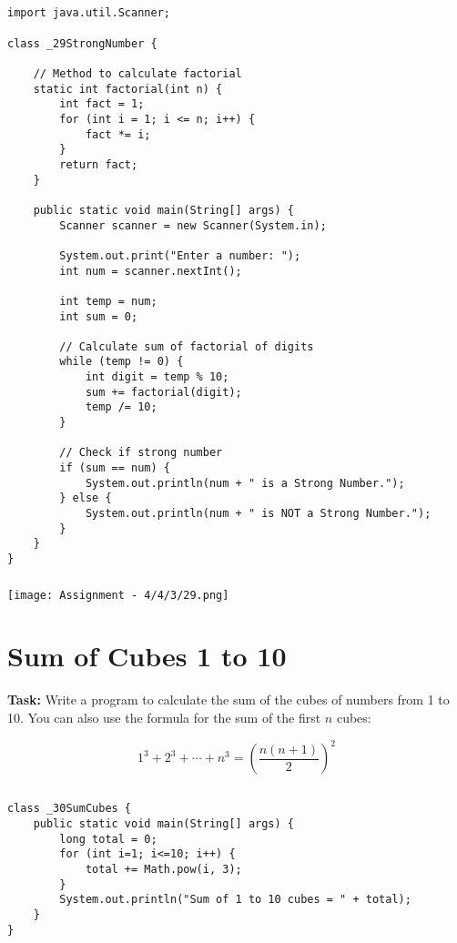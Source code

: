 \documentclass[12pt,a4paper]{article}
\begin{document}
\subsection{}
\begin{lstlisting}
import java.util.Scanner;

class _29StrongNumber {
    
    // Method to calculate factorial
    static int factorial(int n) {
        int fact = 1;
        for (int i = 1; i <= n; i++) {
            fact *= i;
        }
        return fact;
    }
    
    public static void main(String[] args) {
        Scanner scanner = new Scanner(System.in);
    
        System.out.print("Enter a number: ");
        int num = scanner.nextInt();
    
        int temp = num;
        int sum = 0;
    
        // Calculate sum of factorial of digits
        while (temp != 0) {
            int digit = temp % 10;
            sum += factorial(digit);
            temp /= 10;
        }
    
        // Check if strong number
        if (sum == num) {
            System.out.println(num + " is a Strong Number.");
        } else {
            System.out.println(num + " is NOT a Strong Number.");
        }
    }
}
\end{lstlisting}

\subsubsection{}
\begin{center}
    \texttt{[image: Assignment - 4/4/3/29.png]}
\end{center}


\section{Sum of Cubes 1 to 10}
\textbf{Task:} Write a program to calculate the sum of the cubes of numbers from 1 to 10.
You can also use the formula for the sum of the first $n$ cubes:

\[
1^3 + 2^3 + \cdots + n^3 = \left( \frac{n(n+1)}{2} \right)^2
\]

\subsection{}
\begin{lstlisting}
class _30SumCubes {
    public static void main(String[] args) {
        long total = 0;
        for (int i=1; i<=10; i++) {
            total += Math.pow(i, 3);
        }
        System.out.println("Sum of 1 to 10 cubes = " + total);
    }
}
\end{lstlisting}
\end{document}
